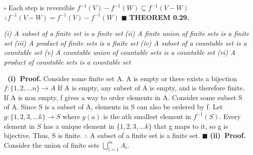 \documentclass[12pt]{article}
\begin{document}
	\newline \(\square\) \newline
	Each step is reversible
	\newline
	\(f^{-1}(V) - f^{-1}(W) \subseteq f^{-1}(V-W)\)
	\newline
	\(\therefore f^{-1}(V - W)=f^{-1}(V) - f^{-1}(W)\)
	\newline \(\blacksquare\)
	\newpage
	\textbf{THEOREM 0.29. }
	\begin{adjustwidth}{1cm}{0cm}
		\textit{(i) A subset of a finite set is a finite set} \newline
		\textit{(ii) A finite union of finite sets is a finite set} \newline
		\textit{(iii) A product of finite sets is a finite set} \newline
		\textit{(iv) A subset of a countable set is a countable set} \newline
		\textit{(v) A countable union of countable sets is a countable set} \newline
		\textit{(vi) A product of countable sets is a countable set}
	\end{adjustwidth}
	\(\ \) \newline
	\textbf{(i)\ Proof.} Consider some finite set A. \newline
	A is empty or there exists a bijection \(f:\{1,2,...n\}\rightarrow A\)
	\newline
	If A is empty, any subset of A is empty, and is therefore finite.
	\newline
	If A is non empty, f gives a way to order elements in A.
	\newline \newline
	Consider some subset S of A. Since S is a subset of A, elements in S can also be ordered by f. \newline \newline
	Let \(g:\{1,2,3,...k\}\rightarrow S\) where \(g(a)\) is the ath smallest element in \(f^{-1}(S)\). Every element in \(S\) has a unique element in \(\{1,2,3,...k\}\) that g maps to it, so g is bijective. \newline
	Thus, S is finite. \newline
	\(\therefore\) A subset of a finite set is a finite set.
	\newline \(\blacksquare\) \newline \newline
	\textbf{(ii)\ Proof.} Consider the union of finite sets \(\bigcup_{i=1}^m A_i\).
	\newline
\end{document}
